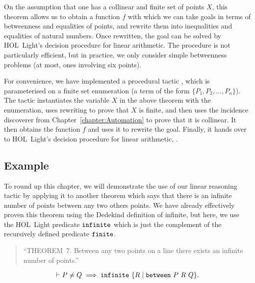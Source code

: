 On the assumption that one has a collinear and finite set of points $X$, this theorem allows us to obtain a function $f$ with which we can take goals in terms of betweenness and equalities of points, and rewrite them into inequalities and equalities of natural numbers. Once rewritten, the goal can be solved by HOL~Light's decision procedure for linear arithmetic. The procedure is not particularly efficient, but in practice, we only consider simple betweenness problems (at most, ones involving six points).

For convenience, we have implemented a procedural tactic , 
which is parameterised on a finite set enumeration (a term of the form $\{P_1,P_2,\ldots,P_n\}$). The tactic instantiates the variable $X$ in the above theorem with the enumeration, uses rewriting to prove that $X$ is finite, and then uses the incidence discoverer from Chapter~\ref{chapter:Automation} to prove that it is collinear. It then obtains the function $f$ and uses it to rewrite the goal. Finally, it hands over to HOL~Light's decision procedure for linear arithmetic, .

\subsection{Example}
To round up this chapter, we will demonstrate the use of our linear reasoning tactic  by applying it to another theorem which says that there is an infinite number of points between any two others points. We have already effectively proven this theorem using the Dedekind definition of infinite, but here, we use the HOL~Light predicate $\texttt{infinite}$ which is just the complement of the recursively defined predicate $\texttt{finite}$.

\begin{quotation}
  ``THEOREM~7. Between any two points on a line there exists an infinite number of points.''
\end{quotation}
\begin{equation*}
\vdash P\neq Q \implies \code{infinite}\ \{R\; \vert\; \between{P}{R}{Q}\}.
\end{equation*}

